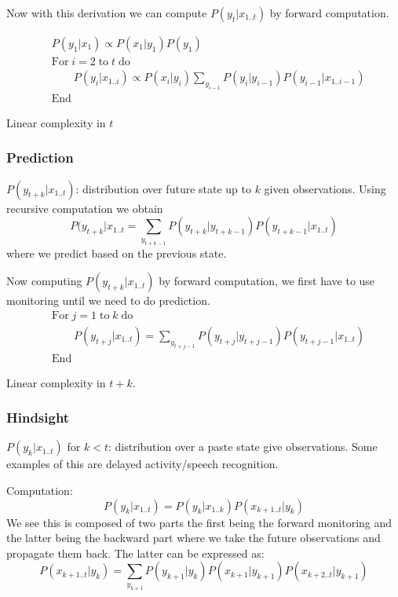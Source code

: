 \documentclass[12pt]{article}
\begin{document}
            Now with this derivation we can compute $P(y_{t}|x_{1..t})$ by forward computation.

            \begin{align*}
                & P(y_1|x_1) \propto P(x_1|y_1)P(y_1) \\
                & \text{For} \; i=2 \; \text{to} \; t \; \text{do} \\
                & \qquad P(y_{i}|x_{1..i}) \propto P(x_i|y_i)\sum_{y_{i-1}} P(y_{i}|y_{i-1})P(y_{i-1}|x_{1..i-1}) \\
                & \text{End}
            \end{align*}

            Linear complexity in $t$
        
        \subsubsection{Prediction}
            $P(y_{t+k}|x_{1..t})$: distribution over future state up to $k$ given observations. Using recursive
            computation we obtain
            $$ P(y_{t+k}|x_{1..t} = \sum_{y_{t+k-1}} P(y_{t+k} | y_{t+k-1})P(y_{t+k-1}|x_{1..t}) $$
            where we predict based on the previous state.

            Now computing $P(y_{t+k} | x_{1..t})$ by forward computation, we first have to use monitoring until we
            need to do prediction.
            \begin{align*}
                & \text{For} \; j=1 \; \text{to} \; k \; \text{do} \\
                & \qquad P(y_{t+j}|x_{1..t}) = \sum_{y_{t+j-1}} P(y_{t+j}|y_{t+j-1})P(y_{t+j-1}|x_{1..t}) \\
                & \text{End}
            \end{align*}

            Linear complexity in $t+k$.
        
        \subsubsection{Hindsight}
            $P(y_k|x_{1..t})$ for $k < t$: distribution over a paste state give observations. Some examples of this
            are delayed activity/speech recognition.

            Computation:
            $$ P(y_k|x_{1..t}) = P(y_k|x_{1..k})P(x_{k+1..t}|y_k) $$
            We see this is composed of two parts the first being the forward monitoring and the latter being the 
            backward part where we take the future observations and propagate them back. The latter can be expressed as:
            $$ P(x_{k+1..t}|y_k) = \sum_{y_{k+1}} P(y_{k+1}|y_k) P(x_{k+1}|y_{k+1})P(x_{k+2..t}|y_{k+1}) $$
\end{document}
